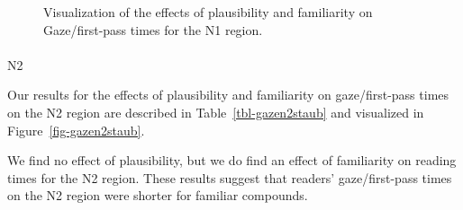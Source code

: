 \documentclass[
  12pt,
  letterpaper,
]{scrreprt}
\makeatletter
\let\oldparagraph\paragraph
\renewcommand{\paragraph}{
    \@ifstar
      \xxxParagraphStar
      \xxxParagraphNoStar
  }
\newcommand{\xxxParagraphStar}[1]{\oldparagraph*{#1}\mbox{}}
\newcommand{\xxxParagraphNoStar}[1]{\oldparagraph{#1}\mbox{}}
\makeatother
\begin{document}
\begin{figure}[htbp]

\caption{\label{fig-gazen1staub}Visualization of the effects of
plausibility and familiarity on Gaze/first-pass times for the N1
region.}


\end{figure}%

\paragraph{N2}\label{n2-1}

Our results for the effects of plausibility and familiarity on
gaze/first-pass times on the N2 region are described in
Table~\ref{tbl-gazen2staub} and visualized in
Figure~\ref{fig-gazen2staub}.

We find no effect of plausibility, but we do find an effect of
familiarity on reading times for the N2 region. These results suggest
that readers' gaze/first-pass times on the N2 region were shorter for
familiar compounds.
\end{document}
